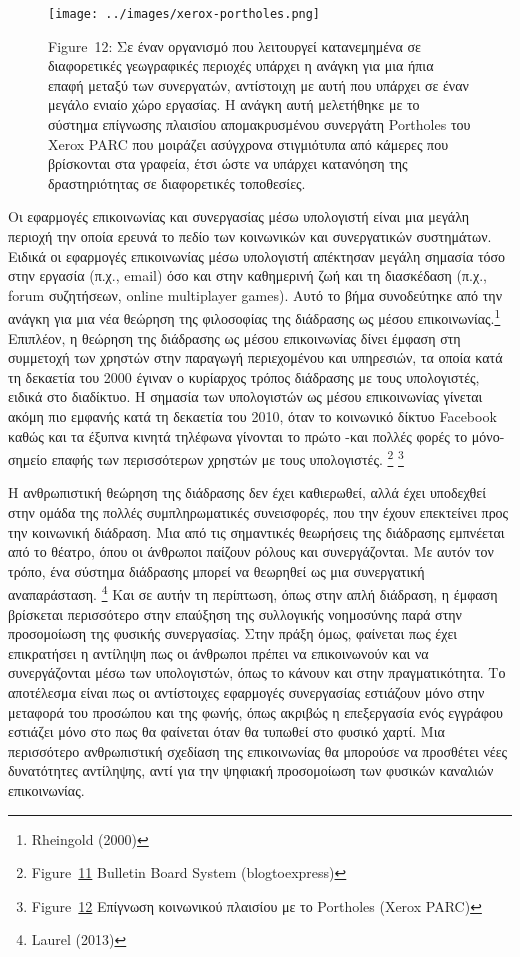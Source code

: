 \documentclass[
]{article}
\begin{document}
\leavevmode{}%
\begin{figure}
\hypertarget{fig:xerox-portholes}{%
\centering
\texttt{[image: ../images/xerox-portholes.png]}
\caption{Figure~12: Σε έναν οργανισμό που λειτουργεί κατανεμημένα σε
διαφορετικές γεωγραφικές περιοχές υπάρχει η ανάγκη για μια ήπια επαφή
μεταξύ των συνεργατών, αντίστοιχη με αυτή που υπάρχει σε έναν μεγάλο
ενιαίο χώρο εργασίας. Η ανάγκη αυτή μελετήθηκε με το σύστημα επίγνωσης
πλαισίου απομακρυσμένου συνεργάτη Portholes του Xerox PARC που μοιράζει
ασύγχρονα στιγμιότυπα από κάμερες που βρίσκονται στα γραφεία, έτσι ώστε
να υπάρχει κατανόηση της δραστηριότητας σε διαφορετικές
τοποθεσίες.}\label{fig:xerox-portholes}
}
\end{figure}

Οι εφαρμογές επικοινωνίας και συνεργασίας μέσω υπολογιστή είναι μια
μεγάλη περιοχή την οποία ερευνά το πεδίο των κοινωνικών και συνεργατικών
συστημάτων. Ειδικά οι εφαρμογές επικοινωνίας μέσω υπολογιστή απέκτησαν
μεγάλη σημασία τόσο στην εργασία (π.χ., email) όσο και στην καθημερινή
ζωή και τη διασκέδαση (π.χ., forum συζητήσεων, online multiplayer
games). Αυτό το βήμα συνοδεύτηκε από την ανάγκη για μια νέα θεώρηση της
φιλοσοφίας της διάδρασης ως μέσου επικοινωνίας.\footnote{Rheingold
  (2000)} Επιπλέον, η θεώρηση της διάδρασης ως μέσου επικοινωνίας δίνει
έμφαση στη συμμετοχή των χρηστών στην παραγωγή περιεχομένου και
υπηρεσιών, τα οποία κατά τη δεκαετία του 2000 έγιναν ο κυρίαρχος τρόπος
διάδρασης με τους υπολογιστές, ειδικά στο διαδίκτυο. Η σημασία των
υπολογιστών ως μέσου επικοινωνίας γίνεται ακόμη πιο εμφανής κατά τη
δεκαετία του 2010, όταν το κοινωνικό δίκτυο Facebook καθώς και τα έξυπνα
κινητά τηλέφωνα γίνονται το πρώτο -και πολλές φορές το μόνο- σημείο
επαφής των περισσότερων χρηστών με τους υπολογιστές. \footnote{Figure~\protect\hyperlink{fig:bbs}{11}
  Bulletin Board System (blogtoexpress)} \footnote{Figure~\protect\hyperlink{fig:xerox-portholes}{12}
  Επίγνωση κοινωνικού πλαισίου με το Portholes (Xerox PARC)}

Η ανθρωπιστική θεώρηση της διάδρασης δεν έχει καθιερωθεί, αλλά έχει
υποδεχθεί στην ομάδα της πολλές συμπληρωματικές συνεισφορές, που την
έχουν επεκτείνει προς την κοινωνική διάδραση. Μια από τις σημαντικές
θεωρήσεις της διάδρασης εμπνέεται από το θέατρο, όπου οι άνθρωποι
παίζουν ρόλους και συνεργάζονται. Με αυτόν τον τρόπο, ένα σύστημα
διάδρασης μπορεί να θεωρηθεί ως μια συνεργατική αναπαράσταση.
\footnote{Laurel (2013)} Και σε αυτήν τη περίπτωση, όπως στην απλή
διάδραση, η έμφαση βρίσκεται περισσότερο στην επαύξηση της συλλογικής
νοημοσύνης παρά στην προσομοίωση της φυσικής συνεργασίας. Στην πράξη
όμως, φαίνεται πως έχει επικρατήσει η αντίληψη πως οι άνθρωποι πρέπει να
επικοινωνούν και να συνεργάζονται μέσω των υπολογιστών, όπως το κάνουν
και στην πραγματικότητα. Το αποτέλεσμα είναι πως οι αντίστοιχες
εφαρμογές συνεργασίας εστιάζουν μόνο στην μεταφορά του προσώπου και της
φωνής, όπως ακριβώς η επεξεργασία ενός εγγράφου εστιάζει μόνο στο πως θα
φαίνεται όταν θα τυπωθεί στο φυσικό χαρτί. Μια περισσότερο ανθρωπιστική
σχεδίαση της επικοινωνίας θα μπορούσε να προσθέτει νέες δυνατότητες
αντίληψης, αντί για την ψηφιακή προσομοίωση των φυσικών καναλιών
επικοινωνίας.
\end{document}
